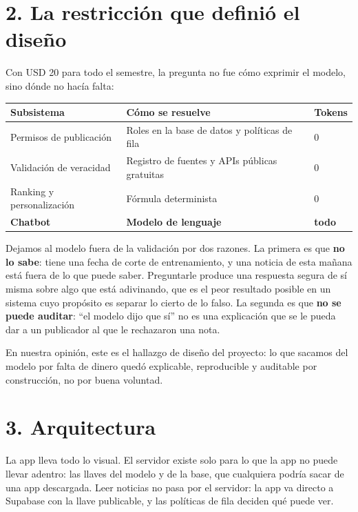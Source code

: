 \documentclass[12pt,a4paper]{article}
\begin{document}
\section{2. La restricción que definió el diseño}

Con USD 20 para todo el semestre, la pregunta no fue cómo exprimir el modelo, sino dónde no hacía
falta:

\begin{center}
\renewcommand{\arraystretch}{1.4}
\begin{tabular}{|>{\raggedright\arraybackslash}p{4.2cm}|>{\raggedright\arraybackslash}p{7.4cm}|p{2cm}|}
\hline
\textbf{Subsistema} & \textbf{Cómo se resuelve} & \textbf{Tokens} \\
\hline
Permisos de publicación & Roles en la base de datos y políticas de fila & 0 \\
\hline
Validación de veracidad & Registro de fuentes y APIs públicas gratuitas & 0 \\
\hline
Ranking y personalización & Fórmula determinista & 0 \\
\hline
\textbf{Chatbot} & \textbf{Modelo de lenguaje} & \textbf{todo} \\
\hline
\end{tabular}
\end{center}

Dejamos al modelo fuera de la validación por dos razones. La primera es que \textbf{no lo sabe}:
tiene una fecha de corte de entrenamiento, y una noticia de esta mañana está fuera de lo que puede
saber. Preguntarle produce una respuesta segura de sí misma sobre algo que está adivinando, que es
el peor resultado posible en un sistema cuyo propósito es separar lo cierto de lo falso. La
segunda es que \textbf{no se puede auditar}: ``el modelo dijo que sí'' no es una explicación que se
le pueda dar a un publicador al que le rechazaron una nota.

En nuestra opinión, este es el hallazgo de diseño del proyecto: lo que sacamos del modelo por falta
de dinero quedó explicable, reproducible y auditable por construcción, no por buena voluntad.

\section{3. Arquitectura}

La app lleva todo lo visual. El servidor existe solo para lo que la app no puede llevar adentro:
las llaves del modelo y de la base, que cualquiera podría sacar de una app descargada. Leer
noticias no pasa por el servidor: la app va directo a Supabase con la llave publicable, y las
políticas de fila deciden qué puede ver.
\end{document}
